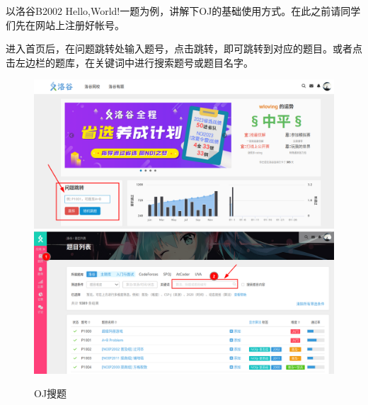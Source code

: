 以洛谷B2002 Hello,World!一题为例，讲解下OJ的基础使用方式。在此之前请同学们先在网站上注册好帐号。

进入首页后，在问题跳转处输入题号，点击跳转，即可跳转到对应的题目。或者点击左边栏的题库，在关键词中进行搜索题号或题目名字。

\begin{figure}[H]
\centering
\includegraphics[width=0.4\linewidth]{02chapter/img/问题跳转}
\hspace{1in}
\includegraphics[width=0.4\linewidth]{02chapter/img/题库}
\caption{OJ搜题}
\label{fig:}
\end{figure}

